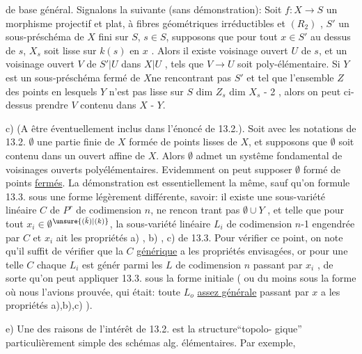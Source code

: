 
de base général. Signalons la suivante (sans démonstration): Soit $f:X\to S$
un morphisme projectif et plat,  à fibres géométriques
 irréductibles et $(R_2)$ , $S'$ un sous-préschéma de $X$ fini sur $S$,
$s\in S$, supposons que pour tout $x\in S'$ au dessus de $s$, $X_s$ soit lisse sur
$k(s)$ en $x$ . Alors il existe  voisinage ouvert $U$ de $s$, et un voisinage
ouvert $V$ de $S'|U$ dans $X|U$ , tels que $V\longrightarrow U$ soit poly-élémentaire.
Si $Y$ est un sous-préschéma fermé de $X$ne rencontrant pas $S'$ et tel que l'ensemble $Z$ des points
en lesquels $Y$ n'est pas lisse sur $S$   
dim $Z_s$ \hand{$\leq$} dim $X_s$ - 2 , alors on peut ci-dessus prendre $V$ contenu dans
$X$ - $Y$.

c) (A être éventuellement inclus dans l'énoncé de 13.2.). Soit
avec les notations de 13.2. $\emptyset$ une partie finie de $X$ formée de points
lisses de $X$, et supposons que $\emptyset$ soit contenu dans un  ouvert affine
de $X$. Alors $\emptyset$ admet un systême fondamental de voisinages ouverts
polyélémentaires. Evidemment on peut supposer $\emptyset$ formé de points \uline{fermés}. La démonstration est essentiellement la même, sauf
qu'on formule 13.3. sous une forme légèrement différente, savoir: il
existe une sous-variété linéaire $C$ de $P^r$ de codimension $n$, ne rencon%
trant pas $\emptyset\cup Y$ , et telle que pour tout $x_i\in\emptyset$$^{\unsure{(\bar{k})|(k)}}$, la sous-variété
linéaire $L_i$ de codimension $n$-1 engendrée par $C$ et $x_i$ ait les propriétés
a) , b) , c) de 13.3. Pour vérifier ce point, on note qu'il suffit de
vérifier que la $C$ \uline{générique} a les propriétés envisagées, or pour une telle $C$ 
\hand{\unsure{,}} chaque $L_i$ est génér parmi les $L$ de codimension $n$ passant
par $x_i$ , de sorte qu'on peut appliquer 13.3. sous la forme initiale
( ou du moins sous la forme où nous l'avions prouvée, qui était: toute
$L_o$ \uline{assez générale} passant par $x$ a les propriétés a),b),c) ).

e) Une des raisons de l'intérêt de 13.2. est la structure``topolo-%
gique'' particulièrement simple des  schémas alg. élémentaires. Par exemple,

